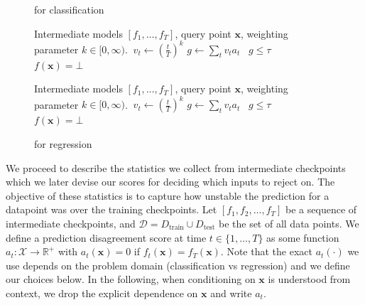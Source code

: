 \begin{figure}
\begingroup
    \begin{minipage}{0.48\textwidth}

    \begin{algorithm}[H]
    	\caption{\sptd for classification}\label{alg:sptd_class}
    	\begin{algorithmic}[1]
    	\Require Intermediate models $[f_1,\ldots,f_T]$, query point $\bm{x}$, weighting parameter $k \in [0,\infty)$.
            \State {}
            \State $\ v_t \gets (\frac{t}{T})^k$
        \EndFor
    \State $g \gets \sum_{t} v_t a_t$
    \State \algorithmicif\ $g \leq \tau$ \algorithmicthen\  \algorithmicelse\ $f(\bm{x}) = \bot$
    	\end{algorithmic}
    \end{algorithm}
    
    \end{minipage}
    \hfill
    \begin{minipage}{0.48\textwidth}

    \begin{algorithm}[H]
    	\caption{\sptd for regression}\label{alg:sptd_regr}
    	\begin{algorithmic}[1]
    	\Require Intermediate models $[f_1,\ldots,f_T]$, query point $\bm{x}$, weighting parameter $k \in [0,\infty)$. 
            \State {}
            \State $\ v_t \gets (\frac{t}{T})^k$
        \EndFor
    \State $g \gets \sum_{t} v_t a_t$
    \State \algorithmicif\ $g \leq \tau$ \algorithmicthen\  \algorithmicelse\ $f(\bm{x}) = \bot$
    	\end{algorithmic}
    \end{algorithm}
    
    \end{minipage}

    \vspace{-10pt}
\endgroup
\end{figure}

We proceed to describe the statistics we collect from intermediate checkpoints which we later devise our scores for deciding which inputs to reject on. The objective of these statistics is to capture how unstable the prediction for a datapoint was over the training checkpoints. Let $[f_1,f_2,\ldots, f_T]$ be a sequence of intermediate checkpoints, and $\mathcal{D} = D_\text{train} \cup D_\text{test}$ be the set of all data points. We define a prediction disagreement score at time $t \in \{1,\ldots,T\}$ as some function $a_t: \mathcal{X} \rightarrow \mathbb{R}^+$ with $a_t(\bm{x}) = 0$ if $f_t(\bm{x}) = f_T(\bm{x})$. Note that the exact $a_t(\cdot)$ we use depends on the problem domain (classification vs regression) and we define our choices below. In the following, when conditioning on $\bm{x}$ is understood from context, we drop the explicit dependence on $\bm{x}$ and write $a_t$.

